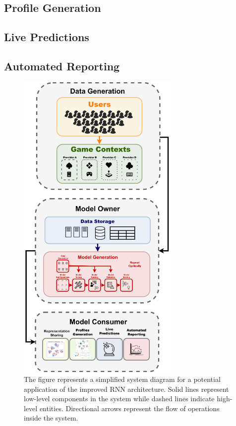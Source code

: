 \subsection{Profile Generation}
\lorem
\subsection{Live Predictions}
\lorem
\subsection{Automated Reporting}
\lorem

\begin{figure}[ht]
\centering
\includegraphics[width=0.7\textwidth]{images/chapter_5/pipeline_diagram.png}
\caption[\textbf{Model Deployment Pipeline}]{The figure represents a simplified system diagram for a potential application of the improved RNN architecture. Solid lines represent low-level components in the system while dashed lines indicate high-level entities. Directional arrows represent the flow of operations inside the system.}
\label{pipeline}
\end{figure}